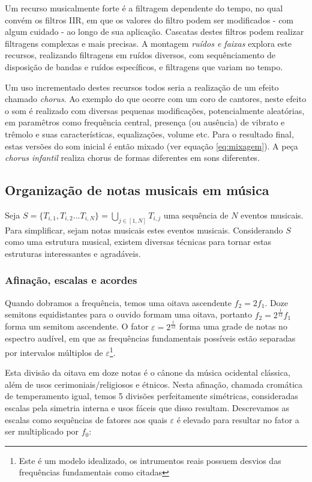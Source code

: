 Um recurso musicalmente forte é a filtragem dependente do tempo, no qual convém os filtros IIR, em que
os valores do filtro podem ser modificados - com algum cuidado - ao longo de sua aplicação. Cascatas
destes filtros podem realizar filtragens complexas e mais precisas. A montagem \emph{ruídos e faixas} explora
este recursos, realizando filtragens em ruídos diversos, com sequênciamento de disposição de bandas
e ruídos específicos, e filtragens que variam no tempo.

Um uso incrementado destes recursos todos seria a realização de um efeito chamado \emph{chorus}. Ao
exemplo do que ocorre com um coro de cantores, neste efeito o som é realizado com diversas pequenas modificações,
potencialmente aleatórias, em paramêtros como frequência central, presença (ou ausência) de vibrato
e trêmolo e suas características, equalizações, volume etc. Para o resultado final, estas versões do som
inicial é então mixado (ver equação \ref{eq:mixagem}). A peça \emph{chorus infantil} realiza chorus de formas
diferentes em sons diferentes.




\clearpage
\subsection{Organização de notas musicais em música}
Seja $ S=\{T_{i,1},T_{i,2}...T_{i,N}\} =\bigcup_{j \in [1,N]} T_{i,j} $ uma sequência de $N$ eventos
musicais. Para simplificar, sejam notas musicais estes eventos musicais.
Considerando $S$ como uma estrutura musical, existem diversas técnicas
para tornar estas estruturas interessantes e agradáveis.

\subsubsection{Afinação, escalas e acordes}
Quando dobramos a frequência, temos uma oitava ascendente $f_2=2f_1$.
Doze semitons equidistantes para o ouvido formam uma oitava,
portanto $f_2=2^{\frac{1}{12}}f_1$ forma um semitom ascendente.
O fator $\varepsilon=2^{\frac{1}{12}}$ forma uma grade de notas
no espectro audível, em que as frequências fundamentais possíveis
estão separadas por intervalos múltiplos de $\varepsilon$\footnote{Este
é um modelo idealizado, os intrumentos reais possuem desvios das frequências
fundamentais como citadas}.

Esta divisão da oitava em doze notas é o cânone da música ocidental clássica,
além de usos cerimoniais/religiosos e étnicos. Nesta afinação, chamada cromática
de temperamento igual, temos 5 divisões perfeitamente simétricas, consideradas
escalas pela simetria interna e usos fáceis que disso resultam. Descrevamos
as escalas como sequências de fatores aos quais $\varepsilon$ é elevado para resultar
no fator a ser multiplicado por $f_0$:

